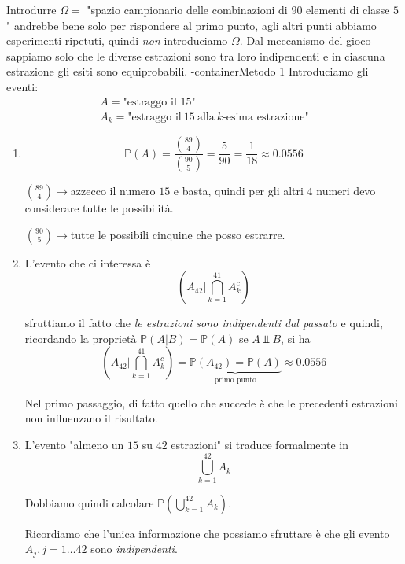 Introdurre $\Omega =$ "spazio campionario delle combinazioni di $90$ elementi di classe $5$" andrebbe bene solo per rispondere al primo punto, agli altri punti abbiamo esperimenti ripetuti, quindi \textit{non} introduciamo $\Omega $. Dal meccanismo del gioco sappiamo solo che le diverse estrazioni sono tra loro indipendenti e in ciascuna estrazione gli esiti sono equiprobabili.
\boxed-container{Metodo 1}
Introduciamo gli eventi:
\begin{gather*}
A=\text{"estraggo il 15"}\\
A_{k} =\text{"estraggo il} \ 15\ \text{alla} \ k\text{-esima estrazione"}
\end{gather*}
\begin{enumerate}
\item \begin{equation*}
\mathbb{P}( A) =\frac{\binom{89}{4}}{\binom{90}{5}} =\frac{5}{90} =\frac{1}{18} \approx 0.0556
\end{equation*}

$\binom{89}{4}\rightarrow $azzecco il numero $15$ e basta, quindi per gli altri $4$ numeri devo considerare tutte le possibilità.

$\binom{90}{5}\rightarrow $tutte le possibili cinquine che posso estrarre.
\item L'evento che ci interessa è\begin{equation*}
\left( A_{42} |\bigcap _{k=1}^{41} A_{k}^{c}\right)
\end{equation*}

sfruttiamo il fatto che \textit{le estrazioni sono indipendenti dal passato} e quindi, ricordando la proprietà $\mathbb{P}( A|B) =\mathbb{P}( A)$ se $A\Bot B$, si ha\begin{equation*}
\left( A_{42} |\bigcap _{k=1}^{41} A_{k}^{c}\right) =\underbrace{\mathbb{P}( A_{42}) =\mathbb{P}( A)}_{\text{primo punto}} \approx 0.0556
\end{equation*}

Nel primo passaggio, di fatto quello che succede è che le precedenti estrazioni non influenzano il risultato.
\item L'evento "almeno un $15$ su $42$ estrazioni" si traduce formalmente in\begin{equation*}
\bigcup _{k=1}^{42} A_{k}
\end{equation*}

Dobbiamo quindi calcolare $\mathbb{P}\left(\bigcup _{k=1}^{42} A_{k}\right)$.

Ricordiamo che l'unica informazione che possiamo sfruttare è che gli evento $A_{j} ,j=1\dotsc 42$ sono \textit{indipendenti}.


\end{enumerate}
